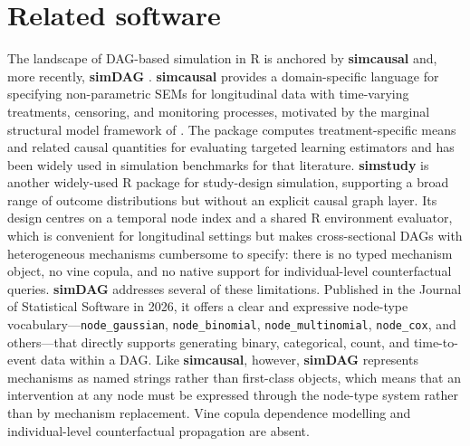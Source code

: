 \documentclass[12pt]{article}
\newcommand{\pkg}[1]{\textbf{#1}}
\newcommand{\proglang}[1]{\textsf{#1}}
\newcommand{\code}[1]{\texttt{#1}}
\begin{document}
\section{Related software}
\label{sec:related}

The landscape of DAG-based simulation in \proglang{R} is anchored by
\pkg{simcausal} \citep{sofrygin2017simcausal} and, more recently,
\pkg{simDAG} \citep{denz2026simdag}. \pkg{simcausal} provides a
domain-specific language for specifying non-parametric SEMs for longitudinal data
with time-varying treatments, censoring, and monitoring processes, motivated by
the marginal structural model framework of \citet{robins2000marginal}.
The package computes treatment-specific means and related causal quantities for
evaluating targeted learning estimators \citep{laan2018targeted} and has been
widely used in simulation benchmarks for that literature. \pkg{simstudy}
\citep{goldfeld2020simstudy} is another widely-used \proglang{R} package for
study-design simulation, supporting a broad range of outcome distributions but
without an explicit causal graph layer. Its design centres on a
temporal node index and a shared \proglang{R} environment evaluator, which is
convenient for longitudinal settings but makes cross-sectional DAGs with
heterogeneous mechanisms cumbersome to specify: there is no typed mechanism object,
no vine copula, and no native support for individual-level counterfactual queries.
\pkg{simDAG} \citep{denz2026simdag} addresses several of these limitations.
Published in the Journal of Statistical Software in 2026, it offers a clear and expressive node-type
vocabulary---\code{node\_gaussian}, \code{node\_binomial}, \code{node\_multinomial},
\code{node\_cox}, and others---that directly supports generating binary, categorical,
count, and time-to-event data within a DAG. Like \pkg{simcausal}, however,
\pkg{simDAG} represents mechanisms as named strings rather than first-class
objects, which means that an intervention at any node must be expressed through the
node-type system rather than by mechanism replacement. Vine copula dependence
modelling and individual-level counterfactual propagation are absent.
\end{document}
